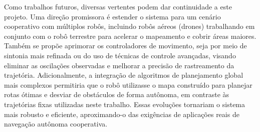 Como trabalhos futuros, diversas vertentes podem dar continuidade a este projeto. Uma direção promissora é estender o sistema para um cenário cooperativo com múltiplos robôs, incluindo robôs aéreos (drones) trabalhando em conjunto com o robô terrestre para acelerar o mapeamento e cobrir áreas maiores. Também se propõe aprimorar os controladores de movimento, seja por meio de sintonia mais refinada ou do uso de técnicas de controle avançadas, visando eliminar as oscilações observadas e melhorar a precisão de rastreamento da trajetória. Adicionalmente, a integração de algoritmos de planejamento global mais complexos permitiria que o robô utilizasse o mapa construído para planejar rotas ótimas e desviar de obstáculos de forma autônoma, em contraste às trajetórias fixas utilizadas neste trabalho. Essas evoluções tornariam o sistema mais robusto e eficiente, aproximando-o das exigências de aplicações reais de navegação autônoma cooperativa.
